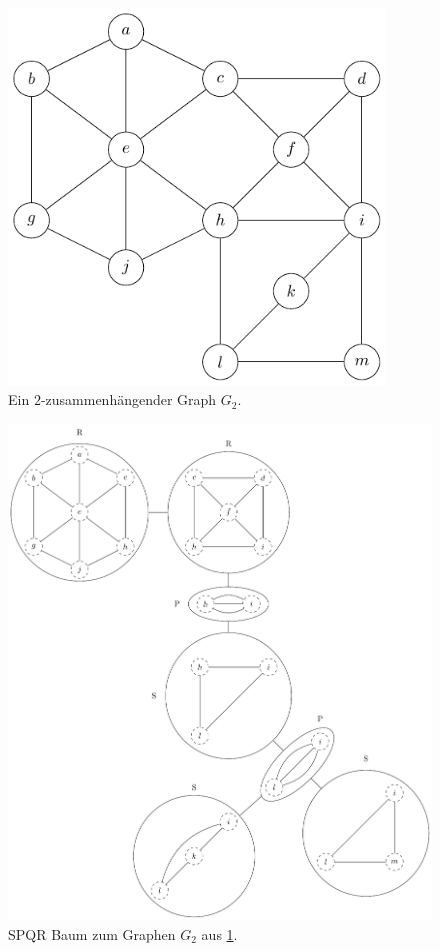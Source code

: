 \ \\

\begin{figure}[H]
  \centering
  \includegraphics[width=10cm]{bilder/2-Block-Tree1.pdf}
  \caption{Ein $2$-zusammenhängender Graph $G_2$.}
  \label{fig:2-Block-Tree1}
\end{figure}

\newpage

\begin{figure}[H]
  \centering
  \includegraphics[width=\textwidth,height=\textheight,keepaspectratio]{bilder/SPQR-Tree.pdf}
  \caption{SPQR Baum zum Graphen $G_2$ aus \Abb \ref{fig:2-Block-Tree1}.}
  \label{fig:SPQR-Tree}
\end{figure}

